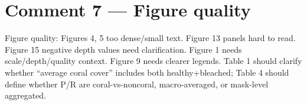 \documentclass[12pt]{article}
\newenvironment{reviewercomment}{%
  \begin{mdframed}[backgroundcolor=gray!10,linecolor=gray!40,
                   leftmargin=0pt,rightmargin=0pt,
                   innerleftmargin=8pt,innerrightmargin=8pt,
                   innertopmargin=6pt,innerbottommargin=6pt]
  \itshape\color{quotegray}%
}{%
  \end{mdframed}%
}
\begin{document}
\section*{Comment 7 --- Figure quality}

\begin{reviewercomment}
Figure quality: Figures 4, 5 too dense/small text.  Figure 13 panels hard to
read.  Figure 15 negative depth values need clarification.  Figure 1 needs
scale/depth/quality context.  Figure 9 needs clearer legends.  Table 1 should
clarify whether ``average coral cover'' includes both healthy+bleached;
Table 4 should define whether P/R are coral-vs-noncoral, macro-averaged, or
mask-level aggregated.
\end{reviewercomment}
\end{document}
